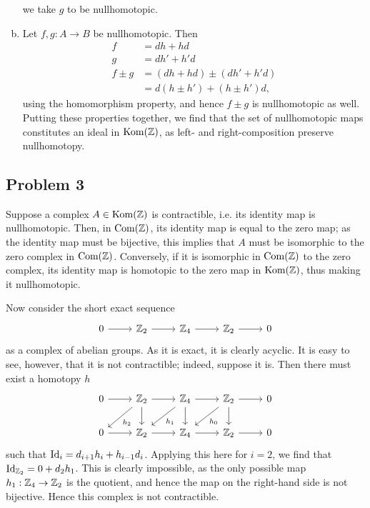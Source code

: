 \documentclass{../mathnotes}
\begin{document}
\begin{enumerate}[(a)]
        we take $g$ to be nullhomotopic.
    \item Let $f,g:A\to B$ be nullhomotopic. Then
        \begin{align*}
            f &= dh+hd\\
            g &= dh'+h'd\\
            f\pm g &= (dh+hd)\pm(dh'+h'd)\\
            &=d(h\pm h')+(h\pm h')d,
        \end{align*}
        using the homomorphism property, and hence $f\pm g$ is nullhomotopic as well. Putting these
        properties together, we find that the set of nullhomotopic maps constitutes an ideal
        in $\text{Kom}(\mathbb{Z})$, as left- and right-composition preserve nullhomotopy.
\end{enumerate}

\subsection*{Problem 3}
Suppose a complex $A\in\text{Kom}(\mathbb{Z})$ is contractible, i.e. its identity map is nullhomotopic.
Then, in $\text{Com}(\mathbb{Z})$, its identity map is equal to the zero map; as the identity map must
be bijective, this implies that $A$ must be isomorphic to the zero complex in $\text{Com}(\mathbb{Z})$.
Conversely, if it is isomorphic in $\text{Com}(\mathbb{Z})$ to the zero complex, its identity map is
homotopic to the zero map in $\text{Kom}(\mathbb{Z})$, thus making it nullhomotopic.

Now consider the short exact sequence
\begin{equation*}
    \begin{tikzcd}
        0\ar{r} & \Z_2\ar{r} & \Z_4\ar{r} & \Z_2\ar{r} & 0
    \end{tikzcd}
\end{equation*}
as a complex of abelian groups. As it is exact, it is clearly acyclic. It is easy to see, however,
that it is not contractible; indeed, suppose it is. Then there must exist a homotopy $h$
\begin{equation*}
    \begin{tikzcd}
        0\ar{r} & \Z_2\ar{r}\ar{d}\ar{dl}{h_2} & \Z_4\ar{r}\ar{d}\ar{dl}{h_1} & \Z_2\ar{r}\ar{d}\ar{dl}{h_0} & 0\\
        0\ar{r} & \Z_2\ar{r} & \Z_4\ar{r} & \Z_2\ar{r} & 0
    \end{tikzcd}
\end{equation*}
such that $\operatorname{Id}_i=d_{i+1}h_i+h_{i-1}d_i$. Applying this here for $i=2$, we find that $\operatorname{Id}_{\mathbb{Z}_2}=0+d_2h_1$.
This is clearly impossible, as the only possible map $h_1:\mathbb{Z}_4\to\mathbb{Z}_2$ is the quotient, and hence the map on
the right-hand side is not bijective. Hence this complex is not contractible.
\end{document}
